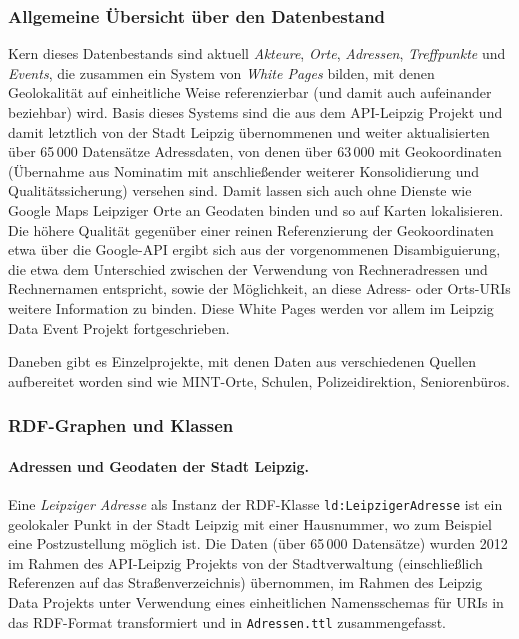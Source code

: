 \documentclass[a4paper,11pt]{article}
\begin{document}
\subsubsection*{Allgemeine Übersicht über den Datenbestand}

Kern dieses Datenbestands sind aktuell \emph{Akteure}, \emph{Orte},
\emph{Adressen}, \emph{Treffpunkte} und \emph{Events}, die zusammen ein System
von \emph{White Pages} bilden, mit denen Geolokalität auf einheitliche Weise
referenzierbar (und damit auch aufeinander beziehbar) wird. Basis dieses
Systems sind die aus dem API-Leipzig Projekt und damit letztlich von der Stadt
Leipzig übernommenen und weiter aktualisierten über 65\,000 Datensätze
Adressdaten, von denen über 63\,000 mit Geokoordinaten (Übernahme aus
Nominatim mit anschließender weiterer Konsolidierung und Qualitätssicherung)
versehen sind. Damit lassen sich auch ohne Dienste wie Google Maps Leipziger
Orte an Geodaten binden und so auf Karten lokalisieren. Die höhere Qualität
gegenüber einer reinen Referenzierung der Geokoordinaten etwa über die
Google-API ergibt sich aus der vorgenommenen Disambiguierung, die etwa dem
Unterschied zwischen der Verwendung von Rechneradressen und Rechnernamen
entspricht, sowie der Möglichkeit, an diese Adress- oder Orts-URIs weitere
Information zu binden. Diese White Pages werden vor allem im Leipzig Data
Event Projekt fortgeschrieben.

Daneben gibt es Einzelprojekte, mit denen Daten aus verschiedenen Quellen
aufbereitet worden sind wie MINT-Orte, Schulen, Polizeidirektion,
Seniorenbüros.

\subsubsection*{RDF-Graphen und Klassen}

\paragraph{Adressen und Geodaten der Stadt Leipzig.} 
Eine \emph{Leipziger Adresse} als Instanz der RDF-Klasse
\texttt{ld:LeipzigerAdresse} ist ein geolokaler Punkt in der Stadt Leipzig mit
einer Hausnummer, wo zum Beispiel eine Postzustellung möglich ist. Die Daten
(über 65\,000 Datensätze) wurden 2012 im Rahmen des API-Leipzig Projekts von
der Stadtverwaltung (einschließlich Referenzen auf das Straßenverzeichnis)
übernommen, im Rahmen des Leipzig Data Projekts unter Verwendung eines
einheitlichen Namensschemas für URIs in das RDF-Format transformiert und in
\texttt{Adressen.ttl} zusammengefasst.
\end{document}
